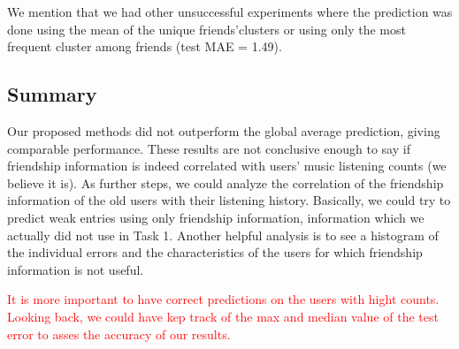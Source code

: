 We mention that we had other unsuccessful experiments where the prediction was done using the mean of the unique friends'clusters or using only the most frequent cluster among friends (test MAE = 1.49).

\subsection{Summary}
Our proposed methods did not outperform the global average prediction, giving comparable performance. These results are not conclusive enough to say if friendship information is indeed correlated with users' music listening counts (we believe it is). As further steps, we could analyze the correlation of the friendship information of the old users with their listening history. Basically, we could try to predict weak entries using only friendship information, information which we actually did not use in Task 1. Another helpful analysis is to see a histogram of the individual errors and the characteristics of the users for which friendship information is not useful.

\textcolor{red}{It is more important to have correct predictions on the users with hight counts. Looking back, we could have kep track of the max and median value of the test error to asses the accuracy of our results.}
